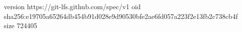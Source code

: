 version https://git-lfs.github.com/spec/v1
oid sha256:e19705a65264db454b91d028e9d90530bfe2ae6fd057a223f2e13fb2c738cb4f
size 724405
